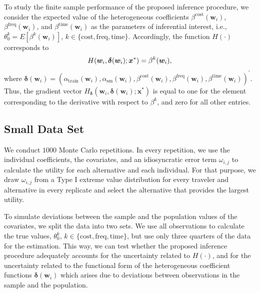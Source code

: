 \documentclass[a4paper, 12pt]{article}
\begin{document}
To study the finite sample performance of the proposed inference procedure, we consider  the expected value of the heterogeneous coefficients     $\beta^{\text{cost}}\left(\bm{w}_i\right)$,  $\beta^\text{freq}\left(\bm{w}_i\right)$, and $\beta^{\text{time}}\left(\bm{w}_i\right)$ as the parameters of inferential interest, i.e., $\theta_0^k = E[\beta^{k}(\bm{w}_i)]$, $k \in \{\text{cost}, \text{freq}, \text{time}  \}$. Accordingly,  the function $H(\cdot)$ corresponds to
\begin{equation}
{H}(\bm{w}_i, \bm{\delta}(\bm{w}_i);\bm{x}^*)=\beta^{k}(\bm{w}_i),\notag
\end{equation}
where $\bm{\delta}(\bm{w}_i)= \left(\alpha_{\text{train}}\left(\bm{w}_i\right), \alpha_{\text{sm}}\left(\bm{w}_i\right), \beta^{\text{cost}}\left(\bm{w}_i\right),\beta^\text{freq}\left(\bm{w}_i\right),  \beta^{\text{time}}\left(\bm{w}_i\right) \right)^{\prime}$.
Thus, the gradient vector $H_{\bm{\delta}}\left(\bm{w}_i, \bm{\delta}(\bm{w}_i);\bm{x}^*\right)$  is equal  to one for the element corresponding to the derivative with respect to  $\beta^{k}$, and zero for all other entries.


\subsection{Small Data Set}

We conduct $1000$ Monte Carlo repetitions. In every repetition, we use the individual coefficients, the covariates, and an idiosyncratic error term $\omega_{i,j}$ to calculate the utility for each alternative and each individual. For that purpose, we draw $\omega_{i,j}$ from a Type I extreme value distribution for every traveler and alternative in every replicate and select the alternative that provides the largest utility. 

To simulate deviations between the sample and the population values of the covariates, we split the data into two sets. We use all observations to calculate the true values, $\theta_0^k$, $k \in \{\text{cost}, \text{freq}, \text{time}  \}$, but use only three quarters of the data for the estimation. This way, we can test whether the proposed inference procedure adequately accounts for  the uncertainty related to $H(\cdot)$, and for the uncertainty related to the functional form of the heterogeneous coefficient functions $\bm{\delta}(\bm{w}_i)$ which arises due to deviations between observations in the sample and the population. 
\end{document}
